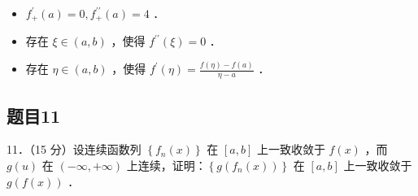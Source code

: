 \documentclass{article}
\begin{document}
\begin{itemize}
  \item[（1）] \(f_{+}^{\prime}(a)=0, f_{+}^{\prime \prime}(a)=4\) ．
  \item[（2）] 存在 \(\xi \in(a, b)\) ，使得 \(f^{\prime \prime}(\xi)=0\) ．
  \item[（3）] 存在 \(\eta \in(a, b)\) ，使得 \(f^{\prime}(\eta)=\frac{f(\eta)-f(a)}{\eta-a}\) ．
\end{itemize}

\subsection{题目11}
11．（15 分）设连续函数列 \(\left\{f_{n}(x)\right\}\) 在 \([a, b]\) 上一致收敛于 \(f(x)\) ，而 \(g(u)\) 在 \((-\infty,+\infty)\) 上连续，证明：\(\left\{g\left(f_{n}(x)\right)\right\}\) 在 \([a, b]\) 上一致收敛于 \(g(f(x))\) ．
\end{document}

